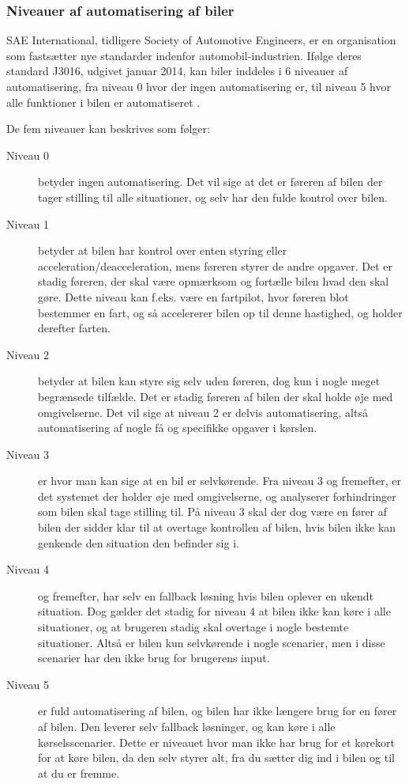 \subsubsection{Niveauer af automatisering af biler}
SAE International, tidligere Society of Automotive Engineers, er en organisation som fastsætter nye standarder indenfor automobil-industrien. Ifølge deres standard J3016, udgivet januar 2014, kan biler inddeles i 6 niveauer af automatisering, fra niveau 0 hvor der ingen automatisering er, til niveau 5 hvor alle funktioner i bilen er automatiseret \cite{SAE_J3016}. 

De fem niveauer kan beskrives som følger:

\begin{description}
	\item[Niveau 0] betyder ingen automatisering. Det vil sige at det er føreren af bilen der tager stilling til alle situationer, og selv har den fulde kontrol over bilen.
	\item[Niveau 1] betyder at bilen har kontrol over enten styring eller acceleration/deacceleration, mens føreren styrer de andre opgaver. Det er stadig føreren, der skal være opmærksom og fortælle bilen hvad den skal gøre. Dette niveau kan f.eks. være en fartpilot, hvor føreren blot bestemmer en fart, og så accelererer bilen op til denne hastighed, og holder derefter farten. 
	\item[Niveau 2] betyder at bilen kan styre sig selv uden føreren, dog kun i nogle meget begrænsede tilfælde. Det er stadig føreren af bilen der skal holde øje med omgivelserne. Det vil sige at niveau 2 er delvis automatisering, altså automatisering af nogle få og specifikke opgaver i kørslen.
	\item[Niveau 3] er hvor man kan sige at en bil er selvkørende. Fra niveau 3 og fremefter, er det systemet der holder øje med omgivelserne, og analyserer forhindringer som bilen skal tage stilling til. På niveau 3 skal der dog være en fører af bilen der sidder klar til at overtage kontrollen af bilen, hvis bilen ikke kan genkende den situation den befinder sig i.
	\item[Niveau 4] og fremefter, har selv en fallback løsning hvis bilen oplever en ukendt situation. Dog gælder det stadig for niveau 4 at bilen ikke kan køre i alle situationer, og at brugeren stadig skal overtage i nogle bestemte situationer. Altså er bilen kun selvkørende i nogle scenarier, men i disse scenarier har den ikke brug for brugerens input.
	\item[Niveau 5] er fuld automatisering af bilen, og bilen har ikke længere brug for en fører af bilen. Den leverer selv fallback løsninger, og kan køre i alle kørselsscenarier. Dette er niveauet hvor man ikke har brug for et kørekort for at køre bilen, da den selv styrer alt, fra du sætter dig ind i bilen og til at du er fremme.
\end{description}

